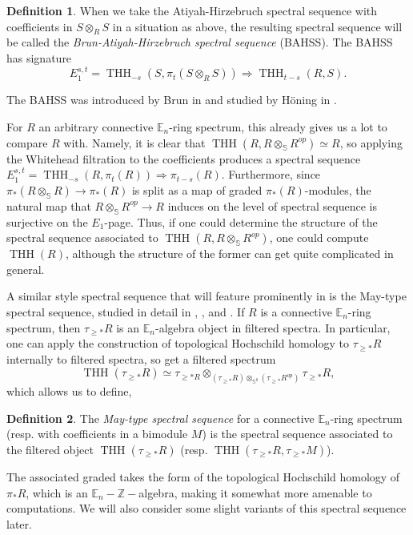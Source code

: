 \documentclass[11pt,leqno]{article}
\newcommand{\zz}{\mathbb{Z}}
\newcommand{\sss}{\mathbb{S}}
\newcommand{\bb}[1]{\mathbb{#1}}
\DeclareMathOperator{\THH}{THH}
\newtheorem*{short hand}{theorem name}
\theoremstyle{plain}  %
\theoremstyle{definition}
\newtheorem{definition}{Definition}[section]
\numberwithin{equation}{section}
\begin{document}
\begin{definition}\label{definition2.8}
When we take the Atiyah-Hirzebruch spectral sequence with coefficients in $S\otimes_{R}S$ in a situation as above, the resulting spectral sequence will be called the \textit{Brun-Atiyah-Hirzebruch spectral sequence} (BAHSS).  The BAHSS has signature $$E_1^{s,t}=\THH_{-s}(S,\pi_{t}(S\otimes_{R}S))\Rightarrow \THH_{t-s}(R,S).$$
\end{definition}
The BAHSS was introduced by Brun in \cite{BRUN200029} and studied by H\"{o}ning in \cite{H2020}.

For $R$ an arbitrary connective $\bb{E}_n$-ring spectrum, this already gives us a lot to compare $R$ with.  Namely, it is clear that $\THH(R,R\otimes_{\sss}R^{op})\simeq R$, so applying the Whitehead filtration to the coefficients produces a spectral sequence $E_1^{s,t}=\THH_{-s}(R,\pi_{t}(R))\Rightarrow \pi_{t-s}(R)$.  Furthermore, since $\pi_*(R\otimes_{\sss}R)\to\pi_*(R)$ is split as a map of graded $\pi_*(R)$-modules, the natural map that $R\otimes_{\sss}R^{op}\to R$ induces on the level of spectral sequence is surjective on the $E_1$-page.  Thus, if one could determine the structure of the spectral sequence associated to $\THH(R,R\otimes_{\sss}R^{op})$, one could compute $\THH(R)$, although the structure of the former can get quite complicated in general.  

A similar style spectral sequence that will feature prominently in  is the May-type spectral sequence, studied in detail in \cite{angeltveit2015algebraic}, \cite{AngeliniKnoll2018}, and \cite{keenan2020filtration}.  If $R$ is a connective $\bb{E}_{n}$-ring spectrum, then $\tau_{\geq *}R$ is an $\bb{E}_n$-algebra object in filtered spectra.  In particular, one can apply the construction of topological Hochschild homology to $\tau_{\geq *}R$ internally to filtered spectra, so get a filtered spectrum $$\THH(\tau_{\geq *}R)\simeq \tau_{\geq *R}\otimes_{(\tau_{\geq *}R)\otimes_{\sss^0}(\tau_{\geq *}R^{op})}\tau_{\geq *}R,$$ which allows us to define,
\begin{definition}\label{definition2.9}
The \textit{May-type spectral sequence} for a connective $\bb{E}_n$-ring spectrum (resp. with coefficients in a bimodule $M$) is the spectral sequence associated to the filtered object $\THH(\tau_{\geq *}R)$ (resp. $\THH(\tau_{\geq *}R,\tau_{\geq *}M)$).
\end{definition}
The associated graded takes the form of the topological Hochschild homology of $\pi_{*}R$, which is an $\bb{E}_{n}-\zz-$algebra, making it somewhat more amenable to computations.  We will also consider some slight variants of this spectral sequence later.
\end{document}

